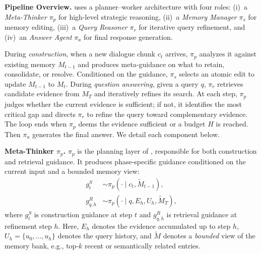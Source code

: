 
\noindent\textbf{Pipeline Overview.}
\method uses a planner--worker architecture with four roles:
(i)~a \textit{Meta-Thinker} $\pi_{p}$ for high-level strategic reasoning,
(ii)~a \textit{Memory Manager} $\pi_{s}$ for memory editing,
(iii)~a \textit{Query Reasoner} $\pi_{r}$ for iterative query refinement, and
(iv)~an \textit{Answer Agent} $\pi_{a}$ for final response generation.

During \emph{construction}, when a new dialogue chunk $c_t$ arrives, $\pi_{p}$ analyzes it against existing memory $M_{t-1}$ and produces meta-guidance on what to retain, consolidate, or resolve.
Conditioned on the guidance, $\pi_{s}$ selects an atomic edit to update $M_{t-1}$ to $M_t$.
During \emph{question answering}, given a query $q$, $\pi_{r}$ retrieves candidate evidence from $M_T$ and iteratively refines its search.
At each step, $\pi_{p}$ judges whether the current evidence is sufficient; if not, it identifies the most critical gap and directs $\pi_{r}$ to refine the query toward complementary evidence.
The loop ends when $\pi_{p}$ deems the evidence sufficient or a budget $H$ is reached. Then $\pi_{a}$ generates the final answer.
We detail each component below.

\noindent\textbf{Meta-Thinker $\pi_{p}$.}
$\pi_{p}$ is the planning layer of \method, responsible for both construction and retrieval guidance.
It produces phase-specific guidance conditioned on the current input and a bounded memory view:
\begin{equation}
\begin{aligned}
g_t^{S} &\sim \pi_{p}(\cdot \mid c_t,\tilde{M}_{t-1}), \\
g_{q,h}^{R} &\sim \pi_{p}(\cdot \mid q, E_h, U_h, \tilde{M}_{T}),
\end{aligned}
\label{eq:meta_guidance}
\end{equation}
where $g_t^{S}$ is construction guidance at step $t$ and $g_{q,h}^{R}$ is retrieval guidance at refinement step $h$.
Here, {$E_h$ denotes the evidence accumulated up to step $h$}, $U_h=\{u_0,\ldots,u_h\}$ denotes the query history, and $\tilde{M}$ denotes a \emph{bounded} view of the memory bank, e.g., top-$k$ recent or semantically related entries.

